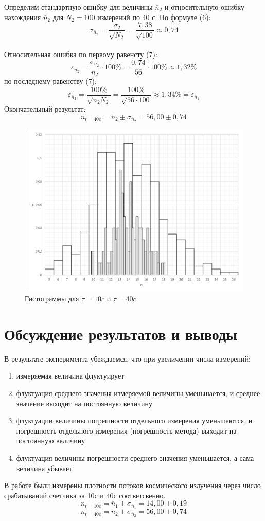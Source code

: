 \documentclass[a4paper,12pt]{article} %
\begin{document}
Определим стандартную ошибку для величины $\overline{n}_2$ и относительную ошибку нахождения $\overline{n}_2$ для $N_2 = 100$ измерений по 40 с. По формуле (6):
\[\sigma_{\overline{n}_2} = \frac{\sigma_2}{\sqrt{{N}_2}} =\frac{7,38}{\sqrt{100}} \approx 0,74\]\\
Относительная ошибка по первому равенсту (7):
\[\varepsilon_{\overline{n}_2} = \frac{\sigma_{\overline{n}_2}}{\overline{n}_2}\cdot 100\% = \frac{0,74}{56} \cdot 100\% \approx 1,32 \%\]
по последнему равенству  (7):
\[\varepsilon_{\overline{n}_2} = \frac{100\%}{\sqrt{\overline{n}_2N_2}} = \frac{100 \%}{\sqrt{56\cdot100}} \approx 1,34\% = \varepsilon_{\overline{n}_1}\]
Окончательный результат:
\[n_{t=40c} = \overline{n}_2 \pm \sigma_{\overline{n}_2} = 56,00 \pm 0,74\]
\newpage
\begin{figure}[h]
\centering
\includegraphics[width=1\textwidth]{12}
\caption{Гистограммы для $\tau = 10c$ и $\tau = 40c$}
\end{figure}
\section{Обсуждение результатов и выводы}
В результате эксперимента убеждаемся, что при увеличении числа измерений:
\begin{enumerate}
\item измеряемая величина флуктуирует
\item флуктуация среднего значения измеряемой величины уменьшается, и среднее значение выходит на постоянную величину
\item флуктуации величины погрешности отдельного измерения уменьшаются, и погрешность отдельного измерения (погрешность метода) выходит на постоянную величину
\item флуктуация величины погрешности среднего значения уменьшается, а сама величина убывает
\end{enumerate}
В работе были измерены плотности потоков космического излучения через число срабатываний счетчика за 10с и 40с соответсвенно.
\[n_{t=10c} = \overline{n}_1 \pm \sigma_{\overline{n}_1} = 14,00 \pm 0,19\]
\[n_{t=40c} = \overline{n}_2 \pm \sigma_{\overline{n}_2} = 56,00 \pm 0,74\]
\end{document}
